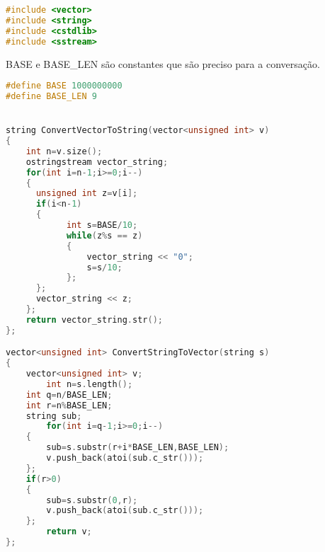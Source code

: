 \begin{lstlisting}[language=C++]
#include <vector>
#include <string>
#include <cstdlib>
#include <sstream>
\end{lstlisting}

BASE e BASE\_LEN são constantes que são preciso para a conversação.
\begin{lstlisting}[language=C++]
#define BASE 1000000000
#define BASE_LEN 9


string ConvertVectorToString(vector<unsigned int> v)
{
	int n=v.size();
	ostringstream vector_string;
	for(int i=n-1;i>=0;i--)
	{
	  unsigned int z=v[i];
	  if(i<n-1)
	  {
            int s=BASE/10;
            while(z%s == z)
            {
                vector_string << "0";
                s=s/10;
            };
	  };
	  vector_string << z;        
	};
	return vector_string.str();
};

vector<unsigned int> ConvertStringToVector(string s)
{
	vector<unsigned int> v;
        int n=s.length();
	int q=n/BASE_LEN;
	int r=n%BASE_LEN;
	string sub;
        for(int i=q-1;i>=0;i--)
	{
		sub=s.substr(r+i*BASE_LEN,BASE_LEN);				
		v.push_back(atoi(sub.c_str()));
	};
	if(r>0)
	{ 
		sub=s.substr(0,r);
		v.push_back(atoi(sub.c_str()));
	};
        return v;
};
\end{lstlisting}








